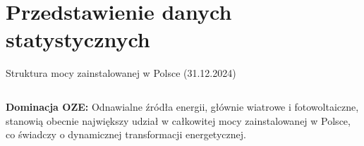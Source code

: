 \section{Przedstawienie danych statystycznych}

\begin{frame}{Struktura mocy zainstalowanej w Polsce (31.12.2024)}
    \begin{columns}[T]
        \begin{column}{0.5\textwidth}
        \end{column}
        
        \begin{column}{0.5\textwidth}
        \end{column}
    \end{columns}
    
    \begin{tcolorbox}[colback=renewable!10, colframe=renewable!80!black, title=Kluczowy wniosek]
         \textbf{Dominacja OZE:} Odnawialne źródła energii, głównie wiatrowe i fotowoltaiczne, stanowią obecnie największy udział w całkowitej mocy zainstalowanej w Polsce, co świadczy o dynamicznej transformacji energetycznej.
    \end{tcolorbox}
\end{frame}

